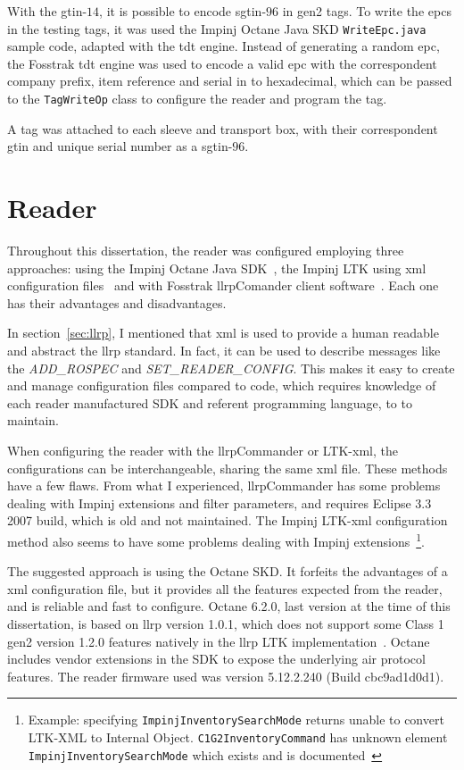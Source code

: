 With the \acs{gtin}-$14$, it is possible to encode \ac{sgtin}-$96$ in \ac{gen2} tags. To write the \acp{epc} in the testing tags, it was used the Impinj Octane Java SKD \texttt{WriteEpc.java} sample code, adapted with the \ac{tdt} engine. Instead of generating a random \ac{epc}, the Fosstrak \ac{tdt} engine was used to encode a valid \ac{epc} with the correspondent company prefix, item reference and serial in to hexadecimal, which can be passed to the \texttt{TagWriteOp} class to configure the reader and program the tag.

A tag was attached to each sleeve and transport box, with their correspondent \ac{gtin} and unique serial number as a \ac{sgtin}-$96$.

\section{Reader}

Throughout this dissertation, the reader was configured employing three approaches: using the Impinj Octane Java SDK~\cite{OctaneSDK}, the Impinj LTK using \ac{xml} configuration files~\cite{LTKXMLJava} and with Fosstrak \ac{llrp}Comander client software~\cite{FosstrakLLRPCommander}.
Each one has their advantages and disadvantages.

In section~\ref{sec:llrp}, I mentioned that \ac{xml} is used to provide a human readable and abstract the \ac{llrp} standard.
In fact, it can be used to describe messages like the \textit{ADD\_ROSPEC} and \textit{SET\_READER\_CONFIG}.
This makes it easy to create and manage configuration files compared to code, which requires knowledge of each reader manufactured SDK and referent programming language, to to maintain.

When configuring the reader with the \acs{llrp}Commander or LTK-\ac{xml}, the configurations can be interchangeable, sharing the same \ac{xml} file. These methods have a few flaws. From what I experienced, \ac{llrp}Commander has some problems dealing with Impinj extensions and filter parameters, and requires Eclipse $3.3$ 2007 build, which is old and not maintained.
The Impinj LTK-\ac{xml} configuration method also seems to have some problems dealing with Impinj extensions~\footnote{Example: specifying \texttt{ImpinjInventorySearchMode} returns unable to convert LTK-XML to Internal Object. \texttt{C1G2InventoryCommand} has unknown element \texttt{ImpinjInventorySearchMode} which exists and is documented~\cite{ImpinjLTKProgrammers}}.

The suggested approach is using the Octane SKD. It forfeits the advantages of a \ac{xml} configuration file, but it provides all the features expected from the reader, and is reliable and fast to configure.
Octane 6.2.0, last version at the time of this dissertation, is based on \ac{llrp} version 1.0.1, which does not support some Class 1 \ac{gen2} version 1.2.0 features natively in the \ac{llrp} LTK implementation~\cite{ImpinjOctaneLLRP}. Octane includes vendor extensions in the SDK to expose the underlying air protocol features.
The reader firmware used was version 5.12.2.240 (Build cbc9ad1d0d1).

